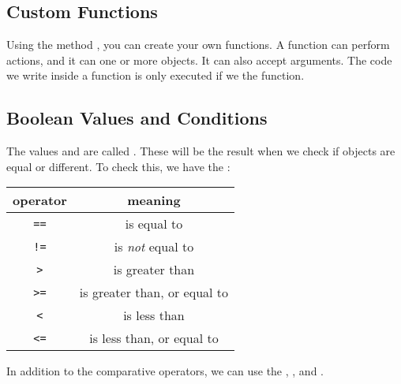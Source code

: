 \newpage
\subsection{Custom Functions}
Using the method , you can create your own functions. A function can perform actions, and it can  one or more objects. It can also accept arguments. The code we write inside a function is only executed if we  the function. \regv


\subsection{Boolean Values and Conditions}
The values  and  are called . These will be the result when we check if objects are equal or different. To check this, we have the :
\begin{center}
	\begin{tabular}{c|c}
		\textbf{operator} & \textbf{meaning} \\ \hline
		\texttt{==}	& is equal to \\ \rowcolor{gray!10}
		\texttt{!=} & is \textsl{not} equal to\\
		\texttt{>} & is greater than \\ \rowcolor{gray!10}
		\texttt{>=} & is greater than, or equal to \\
		\texttt{<} & is less than \\ \rowcolor{gray!10}
		\texttt{<=} & is less than, or equal to \\		
	\end{tabular}
\end{center}
\vsk

In addition to the comparative operators, we can use the  , , and .
